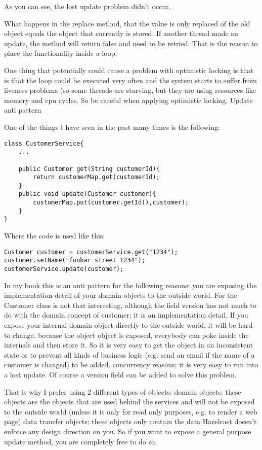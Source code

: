 As you can see, the lost update problem didn't occur.

What happens in the replace method, that the value is only replaced of the old object equals the object that currently is stored. If another thread made an update, the method will return false and need to be retried. That is the reason to place the functionality inside a loop.

One thing that potentially could cause a problem with optimistic locking is that is that the loop could be executed very often and the system starts to suffer from liveness problems (so some threads are starving, but they are using resources like memory and cpu cycles. So be careful when applying optimistic locking.
Update anti pattern

One of the things I have seen in the past many times is the following:

\begin{verbatim}
class CustomerService{
    ...

    public Customer get(String customerId){
        return customerMap.get(customerId);
    }
    public void update(Customer customer){
        customerMap.put(customer.getId(),customer);
    }
}
\end{verbatim}

Where the code is used like this:

\begin{verbatim}
Customer customer = customerService.get("1234");
customer.setName("foobar street 1234");
customerService.update(customer);
\end{verbatim}

In my book this is an anti pattern for the following reasons:
you are exposing the implementation detail of your domain objects to the outside world. For the Customer class is not that interesting, although the field version has not much to do with the domain concept of customer; it is an implementation detail.  If you expose your internal domain object directly to the outside world, it will be hard to change.
because the object object is exposed, everybody can poke inside the internals and then store it. So it is very easy to get the object in an inconsistent state or to prevent all kinds of business logic (e.g. send an email if the name of a customer is changed) to be added.
concurrency reasons; it is very easy to run into a lost update. Of course a version field can be added to solve this problem.

That is why I prefer using 2 different types of objects:
domain objects: these objects are the objects that are used behind the services and will not be exposed to the outside world (unless it is only for read only purposes, e.g. to render a web page)
data transfer objects: these objects only contain the data
Hazelcast doesn't enforce any design direction on you. So if you want to expose a general purpose update method, you are completely free to do so.

